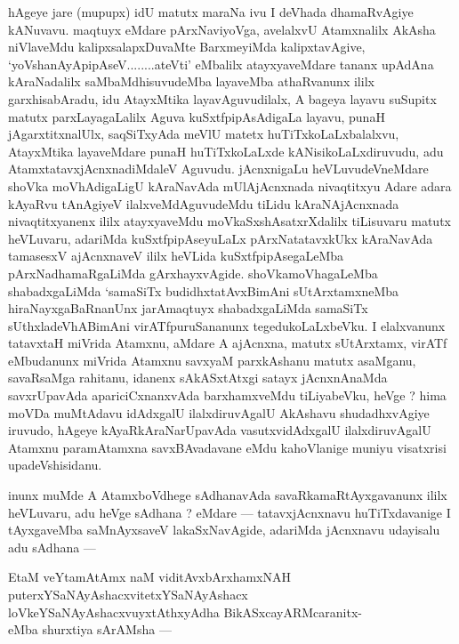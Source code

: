 \begin{artha}
hAgeye jare (mupupx) idU matutx maraNa ivu I deVhada dhamaRvAgiye kANuvavu. maqtuyx eMdare pArxNaviyoVga, avelalxvU Atamxnalilx AkAsha niVlaveMdu kalipxsalapxDuvaMte BarxmeyiMda kalipxtavAgive, `yoV\s shanAyApipAseV........ateVti' eMbalilx atayxyaveMdare tananx upAdAna kAraNadalilx saMbaMdhisuvudeMba laya\-veMba athaRvanunx ililx garxhisabAradu, idu AtayxMtika layavAguvudilalx, A bageya layavu suSupitx matutx parxLayagaLalilx Aguva kuSxtfpipAsAdigaLa layavu, punaH jAgarxtitxnalUlx, saqSiTxyAda meVlU matetx huTiTxkoLaLxbalalxvu, AtayxMtika laya\-veMdare punaH huTiTxkoLaLxde kANisikoLaLxdiruvudu, adu AtamxtatavxjAcnxnadiMdaleV Aguvudu. jAcnxnigaLu heVLuvudeVneMdare shoVka moVhAdigaLigU kAraNavAda mUlA\-jAcnxnada nivaqtitxyu Adare adara kAyaRvu tAnAgiyeV ilalxveMdAguvudeMdu tiLidu kAraNAjAcnxnada nivaqtitxyanenx ililx atayxyaveMdu moVkaSxshAsatxrXdalilx tiLisuvaru matutx heVLuvaru, adariMda kuSxtfpipAseyuLaLx pArxNatatavxkUkx kAraNavAda tamasesxV ajAcnxna\-veV ililx heVLida kuSxtfpipAsegaLeMba pArxNadhamaRgaLiMda gArxhayxvAgide. shoVka\-moVhagaLeMba shabadxgaLiMda `samaSiTx budidhxtatAvxBimAni sUtArxtamxneMba hiraNayxgaBaR\-nanUnx jarAmaqtuyx shabadxgaLiMda samaSiTx sUthxladeVhABimAni virATfpuruSananunx tegedukoLaLxbeVku. I elalxvanunx tatavxtaH miVrida Atamxnu, aMdare A ajAcnxna, matutx sUtArxtamx, virATf eMbudanunx miVrida Atamxnu savxyaM parxkAshanu matutx asaMganu, savaRsaMga rahitanu, idanenx sAkASxtAtxgi satayx jAcnxnAnaMda savxrUpavAda apariciCxnanx\-vAda barxhamxveMdu tiLiyabeVku, heVge ? hima moVDa muMtAdavu idAdxgalU ilalxdiruvAgalU AkAshavu shudadhxvAgiye iruvudo, hAgeye kAyaRkAraNa\-rUpavAda vasutxvidAdxgalU ilalxdiruvAgalU Atamxnu paramAtamxna savxBAvadavane eMdu kahoVlanige muniyu visatxrisi upadeVshisidanu.
\end{artha}


\begin{artha}
inunx muMde A AtamxboVdhege sAdhanavAda savaRkamaRtAyxgavanunx ililx heVLuvaru, adu heVge sAdhana ? eMdare --- tatavxjAcnxnavu huTiTxdavanige I tAyxgaveMba saMnAyxsaveV lakaSxNavAgide, adariMda jAcnxnavu udayisalu adu sAdhana ---

EtaM veYtamAtAmx naM viditAvxbArxhamxNAH puterxYSaNAyAshacxvitetxYSaNAyAshacx loVkeYSaNAyAshacxvuyxtAthxyAdha BikASxcayARMcaranitx-\\
eMba shurxtiya sArAMsha ---
\end{artha}

